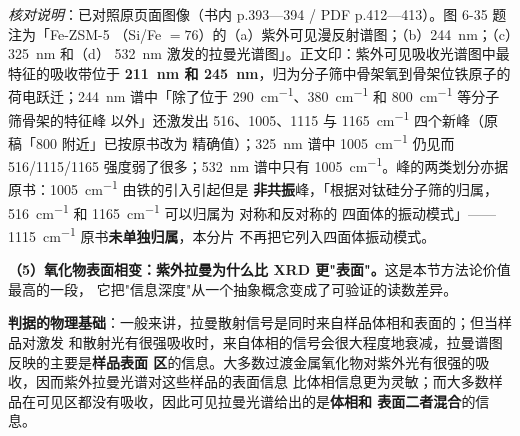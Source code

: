 \emph{核对说明}：已对照原页面图像（书内 p.393—394 / PDF p.412—413）。图 6-35 题注为「Fe-ZSM-5
（Si/Fe $=76$）的（a）紫外可见漫反射谱图；（b）\qty{244}{nm}；（c）\qty{325}{nm} 和（d）
\qty{532}{nm} 激发的拉曼光谱图」。正文印：紫外可见吸收光谱图中最特征的吸收带位于
\textbf{\qty{211}{nm} 和 \qty{245}{nm}}，归为分子筛中骨架氧到骨架位铁原子的荷电跃迁；\qty{244}{nm}
谱中「除了位于 \qty{290}{cm^{-1}}、\qty{380}{cm^{-1}} 和 \qty{800}{cm^{-1}} 等分子筛骨架的特征峰
以外」还激发出 516、1005、1115 与 \qty{1165}{cm^{-1}} 四个新峰（原稿「$800$ 附近」已按原书改为
精确值）；\qty{325}{nm} 谱中 \qty{1005}{cm^{-1}} 仍见而 516/1115/1165 强度弱了很多；\qty{532}{nm}
谱中只有 \qty{1005}{cm^{-1}}。峰的两类划分亦据原书：\qty{1005}{cm^{-1}} 由铁的引入引起但是
\textbf{非共振}峰，「根据对钛硅分子筛的归属，\qty{516}{cm^{-1}} 和 \qty{1165}{cm^{-1}} 可以归属为
对称和反对称的  四面体的振动模式」——\qty{1115}{cm^{-1}} 原书\textbf{未单独归属}，本分片
不再把它列入四面体振动模式。

\textbf{（5）氧化物表面相变：紫外拉曼为什么比 XRD 更"表面"。}这是本节方法论价值最高的一段，
它把"信息深度"从一个抽象概念变成了可验证的读数差异。

\textbf{判据的物理基础}：一般来讲，拉曼散射信号是同时来自样品体相和表面的；但当样品对激发
和散射光有很强吸收时，来自体相的信号会很大程度地衰减，拉曼谱图反映的主要是\textbf{样品表面
区}的信息。大多数过渡金属氧化物对紫外光有很强的吸收，因而紫外拉曼光谱对这些样品的表面信息
比体相信息更为灵敏；而大多数样品在可见区都没有吸收，因此可见拉曼光谱给出的是\textbf{体相和
表面二者混合}的信息。

